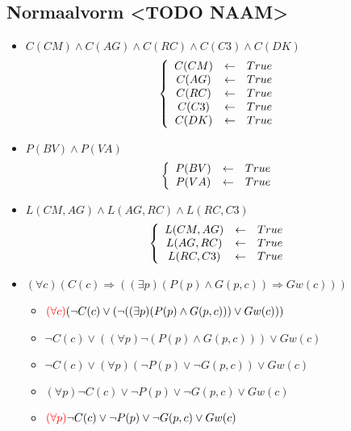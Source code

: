 \documentclass[alternative-exam.tex]{subfiles}
\begin{document}
\subsection{Normaalvorm <TODO NAAM>}
\begin{itemize}
\item $C(CM)\wedge C(AG)\wedge C(RC)\wedge C(C3)\wedge C(DK)$
\[
\left\{
\begin{array}{c c c}
C(CM) &\leftarrow& True\\
C(AG) &\leftarrow& True\\
C(RC) &\leftarrow& True\\
C(C3) &\leftarrow& True\\
C(DK) &\leftarrow& True\\
\end{array}
\right.
\]

\item $P(BV) \wedge P(VA)$
\[
\left\{
\begin{array}{c c c}
P(BV) &\leftarrow& True\\
P(VA) &\leftarrow& True\\
\end{array}
\right.
\]

\item $L(CM,AG) \wedge L(AG,RC) \wedge L(RC,C3)$
\[
\left\{
\begin{array}{c c c}
L(CM,AG) &\leftarrow& True\\
L(AG,RC) &\leftarrow& True\\
L(RC,C3) &\leftarrow& True\\
\end{array}
\right.
\]

\item $(\forall c)(C(c) \Rightarrow ((\exists p) (P(p) \wedge G(p,c)) \Rightarrow Gw(c)))$
\begin{itemize}
\item $ {\color{red}(\forall c)} (\neg C(c) \vee (\neg ((\exists p)(P(p)\wedge G(p,c))) \vee Gw(c)))$

\item $\neg C(c) \vee ((\forall p)\neg(P(p)\wedge G(p,c))) \vee Gw(c)$

\item $\neg C(c) \vee (\forall p)(\neg P(p)\vee \neg G(p,c)) \vee Gw(c)$

\item $(\forall p) \neg C(c) \vee \neg P(p) \vee \neg G(p,c) \vee Gw(c)$

\item ${\color{red}(\forall p)} \neg C(c) \vee \neg P(p) \vee \neg G(p,c) \vee Gw(c)$


\end{itemize}
\end{itemize}
\end{document}
